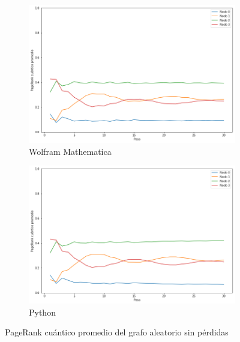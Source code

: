 \begin{figure}[H]
    \centering
    \begin{subfigure}[m]{0.45\textwidth}
        \centering
        \includegraphics[width=0.9\linewidth]{img/any-mean-M.png}
        \caption{Wolfram Mathematica}
    \end{subfigure}
    \begin{subfigure}[m]{0.45\textwidth}
        \centering
        \includegraphics[width=0.9\linewidth]{img/any-mean-lossless.png}
        \caption{Python}
    \end{subfigure}
    \caption[PageRank cuántico promedio del grafo aleatorio sin pérdidas]{PageRank cuántico promedio del grafo aleatorio sin pérdidas}
    \label{fig:meananylossless}
\end{figure}

